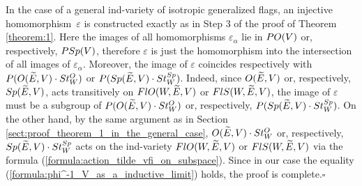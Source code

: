 \documentclass[11pt, a4paper]{article}
\begin{document}
In the case of a general ind-variety of isotropic generalized flags, an injective homomorphism~$\varepsilon$ is constructed exactly as in Step 3 of the proof of Theorem \ref{theorem:1}. %
Here the images of all homomorphisms $\varepsilon_{\alpha}$ lie in $P O(V)$ or, respectively, $P Sp(V)$, therefore $\varepsilon$ is just the homomorphism into the intersection of all images of $\varepsilon_{\alpha}$. %
Moreover, the image of $\varepsilon$ coincides respectively with $P(O(\widetilde{E},V)\cdot St^{O}_W)$ or $P(Sp(\widetilde{E},V)\cdot St^{Sp}_W)$. Indeed, since $O(\widetilde{E},V)$ or, respectively, $Sp(\widetilde{E},V)$, acts transitively on $FlO(W,\widetilde{E},V)$ or $FlS(W,\widetilde{E},V)$, the image of $\varepsilon$ must be a subgroup of $P(O(\widetilde{E},V)\cdot St^{O}_W)$ or, respectively, $P(Sp(\widetilde{E},V)\cdot St^{Sp}_W)$. On the other hand, by the same argument as in Section \ref{sect:proof_theorem_1_in_the_general_case}, $O(\widetilde{E},V)\cdot St^{O}_W$ or, respectively, $Sp(\widetilde{E},V)\cdot St^{Sp}_W$ acts on the ind-variety $FlO(W,\widetilde{E},V)$ or $FlS(W,\widetilde{E},V)$ via the formula (\ref{formula:action_tilde_vfi_on_subspace}). Since in our case the equality (\ref{formula:phi^-1_V_as_a_inductive_limit}) holds, the proof is complete.\hspace{\fill}$\square$\par

\end{document}
